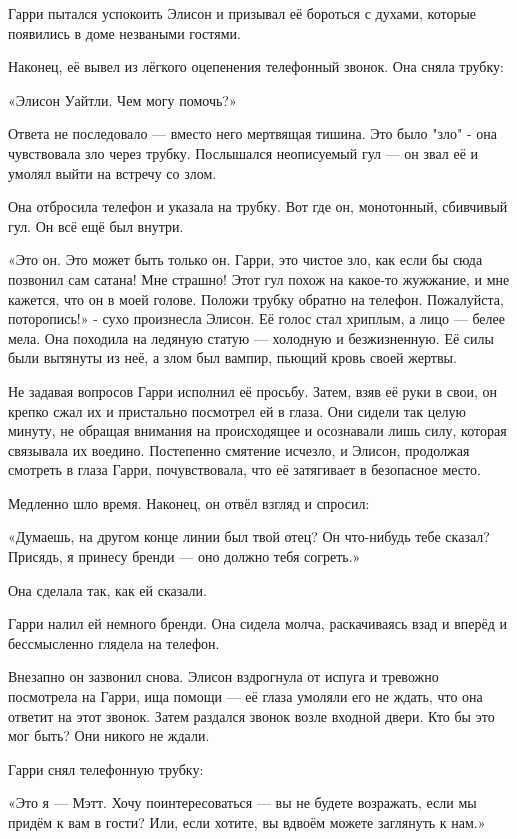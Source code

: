\documentclass[a4paper,12pt]{book}
\begin{document}
Гарри пытался успокоить Элисон и призывал её бороться с духами, которые появились в доме незваными гостями.
\par
Наконец, её вывел из лёгкого оцепенения телефонный звонок. Она сняла трубку:\\
\par
«Элисон Уайтли. Чем могу помочь?»\\
\par
Ответа не последовало — вместо него мертвящая тишина. Это было "зло" - она чувствовала зло через трубку. Послышался неописуемый гул — он звал её и умолял выйти на встречу со злом.
\par
Она отбросила телефон и указала на трубку. Вот где он, монотонный, сбивчивый гул. Он всё ещё был внутри.
\par
«Это он. Это может быть только он. Гарри, это чистое зло, как если бы сюда позвонил сам сатана! Мне страшно! Этот гул похож на какое-то жужжание, и мне кажется, что он в моей голове. Положи трубку обратно на телефон. Пожалуйста, поторопись!» - сухо произнесла Элисон. Её голос стал хриплым, а лицо — белее мела. Она походила на ледяную статую — холодную и безжизненную. Её силы были вытянуты из неё, а злом был вампир, пьющий кровь своей жертвы.
\par
Не задавая вопросов Гарри исполнил её просьбу. Затем, взяв её руки в свои, он крепко сжал их и пристально посмотрел ей в глаза. Они сидели так целую минуту, не обращая внимания на происходящее и осознавали лишь силу, которая связывала их воедино. Постепенно смятение исчезло, и Элисон, продолжая смотреть в глаза Гарри, почувствовала, что её затягивает в безопасное место.
\par
Медленно шло время. Наконец, он отвёл взгляд и спросил:
\par
«Думаешь, на другом конце линии был твой отец? Он что-нибудь тебе сказал? Присядь, я принесу бренди — оно должно тебя согреть.»
\par
Она сделала так, как ей сказали.
\par
Гарри налил ей немного бренди. Она сидела молча, раскачиваясь взад и вперёд и бессмысленно глядела на телефон.
\par
Внезапно он зазвонил снова. Элисон вздрогнула от испуга и тревожно посмотрела на Гарри, ища помощи — её глаза умоляли его не ждать, что она ответит на этот звонок. Затем раздался звонок возле входной двери. Кто бы это мог быть? Они никого не ждали.
\par
Гарри снял телефонную трубку:
\par
«Это я — Мэтт. Хочу поинтересоваться — вы не будете возражать, если мы придём к вам в гости? Или, если хотите, вы вдвоём можете заглянуть к нам.»
\end{document}

